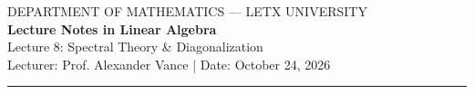 \documentclass[10pt, letterpaper]{article}
\begin{document}
\thispagestyle{plain}

\begin{center}
    {\sffamily\color{muted}\uppercase{Department of Mathematics --- LetX University}} \\
    \vspace{0.4cm}
    {\sffamily\bfseries\Huge\color{thmcolor} Lecture Notes in Linear Algebra} \\
    \vspace{0.2cm}
    {\sffamily\Large\color{proofcolor} Lecture 8: Spectral Theory \& Diagonalization} \\
    \vspace{0.4cm}
    {\sffamily\large Lecturer: Prof. Alexander Vance \quad | \quad Date: October 24, 2026}
    \vspace{0.4cm}
    {\color{linecolor}\rule{\linewidth}{1.2pt}}
\end{center}
\vspace{0.5cm}




\end{document}
